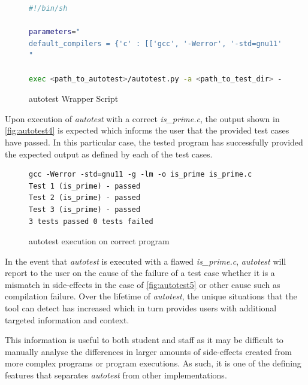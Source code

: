\documentclass[hidelinks]{report}
\begin{document}
\begin{figure}[h]
	\centering
	\begin{lstlisting}[language=bash, breaklines=true, linewidth=\linewidth]
#!/bin/sh

parameters="
default_compilers = {'c' : [['gcc', '-Werror', '-std=gnu11', '-g', '-lm']]}
"

exec <path_to_autotest>/autotest.py -a <path_to_test_dir> --parameters "$parameters" "$@"
	\end{lstlisting}
	\caption{autotest Wrapper Script}
	\label{fig:autotest3}
\end{figure}

Upon execution of \textit{autotest} with a correct \textit{is\_prime.c}, the output shown in \autoref{fig:autotest4} is expected which informs the user that the provided test cases have passed. In this particular case, the tested program has successfully provided the expected output as defined by each of the test cases.

\begin{figure}[h]
	\centering
	\begin{lstlisting}[breaklines=true, linewidth=\linewidth]
gcc -Werror -std=gnu11 -g -lm -o is_prime is_prime.c
Test 1 (is_prime) - passed
Test 2 (is_prime) - passed
Test 3 (is_prime) - passed
3 tests passed 0 tests failed
	\end{lstlisting}
	\caption{autotest execution on correct program}
	\label{fig:autotest4}
\end{figure}

In the event that \textit{autotest} is executed with a flawed \textit{is\_prime.c}, \textit{autotest} will report to the user on the cause of the failure of a test case whether it is a mismatch in side-effects in the case of \autoref{fig:autotest5} or other cause such as compilation failure. Over the lifetime of \textit{autotest}, the unique situations that the tool can detect has increased which in turn provides users with additional targeted information and context.

This information is useful to both student and staff as it may be difficult to manually analyse the differences in larger amounts of side-effects created from more complex programs or program executions.  As such, it is one of the defining features that separates \textit{autotest} from other implementations.
\end{document}
